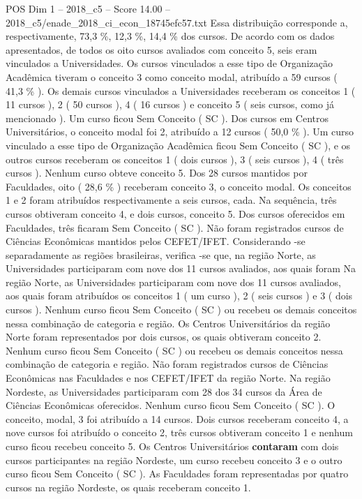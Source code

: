 \begin{textsample}{POS Dim 1 – 2018\_c5 – Score 14.00 – 2018\_c5/enade\_2018\_ci\_econ\_18745efc57.txt}
Essa distribuição corresponde a, respectivamente, 73,3 \%, 12,3 \%, 14,4 \% dos cursos.
De acordo com os dados apresentados, de todos os oito cursos avaliados com conceito 5, seis eram vinculados a Universidades.
Os cursos vinculados a esse tipo de Organização Acadêmica tiveram o conceito 3 como conceito modal, atribuído a 59 cursos ( 41,3 \% ).
Os demais cursos vinculados a Universidades receberam os conceitos 1 ( 11 cursos ), 2 ( 50 cursos ), 4 ( 16 cursos ) e conceito 5 ( seis cursos, como já mencionado ).
Um curso ficou Sem Conceito ( SC ).
Dos cursos em Centros Universitários, o conceito modal foi 2, atribuído a 12 cursos ( 50,0 \% ).
Um curso vinculado a esse tipo de Organização Acadêmica ficou Sem Conceito ( SC ), e os outros cursos receberam os conceitos 1 ( dois cursos ), 3 ( seis cursos ), 4 ( três cursos ).
Nenhum curso obteve conceito 5.
Dos 28 cursos mantidos por Faculdades, oito ( 28,6 \% ) receberam conceito 3, o conceito modal.
Os conceitos 1 e 2 foram atribuídos respectivamente a seis cursos, cada.
Na sequência, três cursos obtiveram conceito 4, e dois cursos, conceito 5.
Dos cursos oferecidos em Faculdades, três ficaram Sem Conceito ( SC ).
Não foram registrados cursos de Ciências Econômicas mantidos pelos CEFET/IFET.
Considerando -se separadamente as regiões brasileiras, verifica -se que, na região Norte, as Universidades participaram com nove dos 11 cursos avaliados, aos quais foram Na região Norte, as Universidades participaram com nove dos 11 cursos avaliados, aos quais foram atribuídos os conceitos 1 ( um curso ), 2 ( seis cursos ) e 3 ( dois cursos ).
Nenhum curso ficou Sem Conceito ( SC ) ou recebeu os demais conceitos nessa combinação de categoria e região.
Os Centros Universitários da região Norte foram representados por dois cursos, os quais obtiveram conceito 2.
Nenhum curso ficou Sem Conceito ( SC ) ou recebeu os demais conceitos nessa combinação de categoria e região.
Não foram registrados cursos de Ciências Econômicas nas Faculdades e nos CEFET/IFET da região Norte.
Na região Nordeste, as Universidades participaram com 28 dos 34 cursos da Área de Ciências Econômicas oferecidos.
Nenhum curso ficou Sem Conceito ( SC ).
O conceito, modal, 3 foi atribuído a 14 cursos.
Dois cursos receberam conceito 4, a nove cursos foi atribuído o conceito 2, três cursos obtiveram conceito 1 e nenhum curso ficou recebeu conceito 5.
Os Centros Universitários \textbf{contaram} com dois cursos participantes na região Nordeste, um curso recebeu conceito 3 e o outro curso ficou Sem Conceito ( SC ).
As Faculdades foram representadas por quatro cursos na região Nordeste, os quais receberam conceito 1.

\end{textsample}
